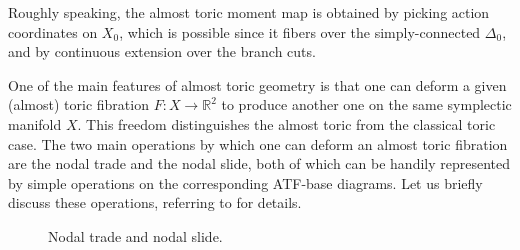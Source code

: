 \documentclass[12pt,a4paper,abstract=true,final]{scrartcl}
\begin{document}
Roughly speaking, the almost toric moment map is obtained by picking action coordinates on $X_0$, which is possible since it fibers over the simply-connected $\Delta_0$, and by continuous extension over the branch cuts.

One of the main features of almost toric geometry is that one can deform a given (almost) toric fibration $F \colon X \rightarrow \mathbb{R}^2$ to produce another one on the same symplectic manifold $X$.
This freedom distinguishes the almost toric from the classical toric case.
The two main operations by which one can deform an almost toric fibration are the nodal trade and the nodal slide, both of which can be handily represented by simple operations on the corresponding ATF-base diagrams.
Let us briefly discuss these operations, referring to \cite[Sections 8.2-8.3]{evans2021atfs} for details.

\begin{figure}
  \centering
  \caption{Nodal trade and nodal slide.}
  \label{fig:nodal_trade_and_slide}
\end{figure}
\end{document}
